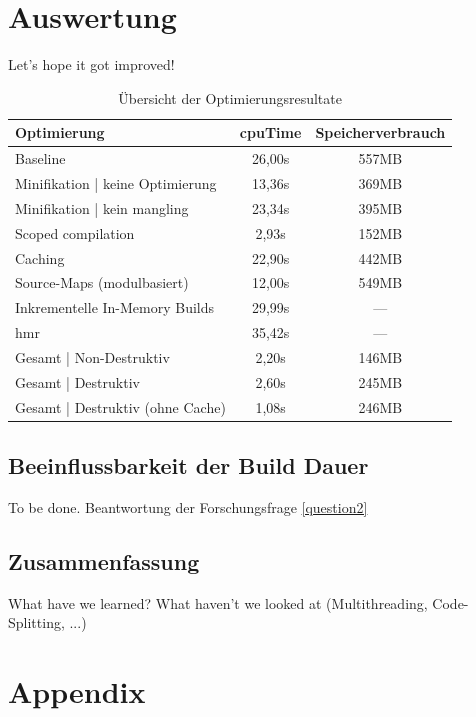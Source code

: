 \documentclass[11pt]{report}
\begin{document}
	\chapter{Auswertung}
		Let's hope it got improved! %
		\begin{table}[h]
			\centering
            \bgroup
            \def\arraystretch{1.5}
			\begin{tabular}{ l | c | c }
				Optimierung & \Gls{cpuTime} & Speicherverbrauch \\
				\hline
				\hline
				Baseline & 26,00s & 557MB \\
				Minifikation | keine Optimierung & 13,36s & 369MB \\
				Minifikation | kein \Gls{mangling} & 23,34s & 395MB \\
				Scoped compilation & 2,93s & 152MB \\
				Caching & 22,90s & 442MB \\
				Source-Maps (modulbasiert) & 12,00s & 549MB \\
				Inkrementelle In-Memory Builds & 29,99s & --- \\
				\Gls{hmr} & 35,42s & --- \\
				\hline
				Gesamt | Non-Destruktiv & 2,20s & 146MB \\
				Gesamt | Destruktiv & 2,60s & 245MB \\
				Gesamt | Destruktiv (ohne Cache) & 1,08s & 246MB \\
			\end{tabular}
			\egroup
            \caption{Übersicht der Optimierungsresultate}
            \label{table:optimizationResultOverview}
		\end{table}
		
		\section{Beeinflussbarkeit der Build Dauer}
			To be done. Beantwortung der Forschungsfrage \ref{question2} %

		\section{Zusammenfassung}
			What have we learned? What haven't we looked at (Multithreading, Code-Splitting, ...) %
			
    \pagebreak

    \chapter{Appendix}
	    \hspace{0pt}
    \vfill
\end{document}
